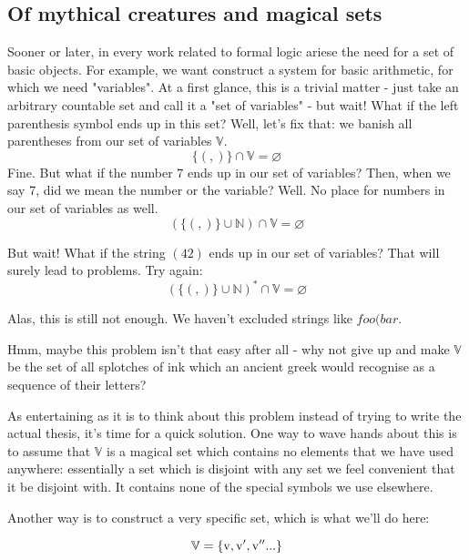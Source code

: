 \documentclass[main.tex]{subfiles}
\begin{document}
\subsection{Of mythical creatures and magical sets}

Sooner or later, in every work related to formal logic ariese the need for
a set of basic objects. For example, we want construct a system for basic
arithmetic, for which we need "variables".
At a first glance, this is a trivial matter - just take an arbitrary countable
set and call it a "set of variables" - but wait! What if the left parenthesis
symbol ends up in this set? Well, let's fix that: we banish all parentheses
from our set of variables $\mathbb{V}$.
\[ \{ (, ) \} \cap \mathbb{V} = \varnothing \]
Fine. But what if the number $7$ ends up in our set of variables? Then,
when we say 7, did we mean the number or the variable? Well. No place for
numbers in our set of variables as well.
\[ ( \{ (, ) \} \cup \mathbb{N} ) \cap \mathbb{V} = \varnothing \]

But wait! What if the string $(42)$ ends up in our set of variables? That will
surely lead to problems. Try again:
\[ ( \{ (, ) \} \cup \mathbb{N} )^* \cap \mathbb{V} = \varnothing \]

Alas, this is still not enough. We haven't excluded strings like $foo(bar$.

Hmm, maybe this problem isn't that easy after all - why not give up and make
$\mathbb{V}$ be the set of all splotches of ink which an ancient greek would
recognise as a sequence of their letters?

As entertaining as it is to think about this problem instead of trying to write
the actual thesis, it's time for a quick solution. One way to wave hands
about this is to assume that $\mathbb{V}$ is a magical set which contains
no elements that we have used anywhere: essentially a set which is disjoint
with any set we feel convenient that it be disjoint with. It contains none of
the special symbols we use elsewhere.

Another way is to construct a very specific set, which is what we'll do here:

\[ \mathbb{V} = \{ \mathrm{v}, \mathrm{v'}, \mathrm{v''} ... \} \]
\end{document}
